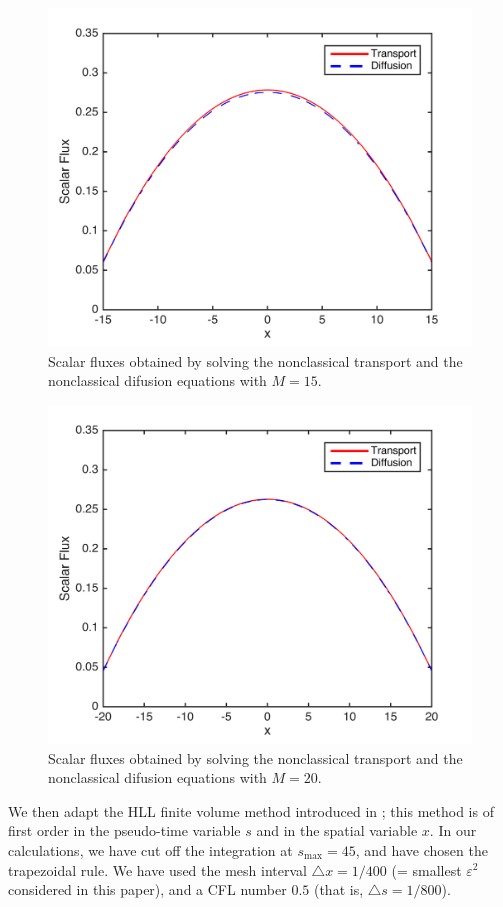 \documentclass{anstrans}
\newcommand{\eps}{\varepsilon}
\begin{document}
\begin{figure}[t] %
  \centering
  \includegraphics[scale=0.7]{Fig3_temp}
  \caption{Scalar fluxes obtained by solving the nonclassical transport and the nonclassical difusion equations with $M=15$.}
  \label{fig3}
\end{figure}
\begin{figure}[t] %
  \centering
  \includegraphics[scale=0.7]{Fig4_temp}
  \caption{Scalar fluxes obtained by solving the nonclassical transport and the nonclassical difusion equations with $M=20$.}
  \label{fig4}
\end{figure}
We then adapt the HLL finite volume method introduced in \cite{kry13}; this method is of first order in the pseudo-time variable $s$ and in the spatial variable $x$. In our calculations, we have cut off the integration at $s_{\text{max}}=45$, and have chosen the trapezoidal rule. We have used the mesh interval $\triangle x=1/400$ (= smallest  $\eps^2$ considered in this paper), and a CFL number $0.5$ (that is, $\triangle s = 1/800$). 
\end{document}
